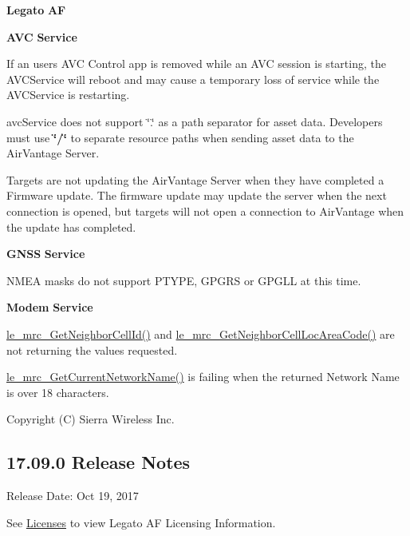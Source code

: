 {\bfseries Legato} {\bfseries AF} 

{\bfseries A\+VC} {\bfseries Service} 
\begin{DoxyItemize}
\item If an users A\+VC Control app is removed while an A\+VC session is starting, the A\+V\+C\+Service will reboot and may cause a temporary loss of service while the A\+V\+C\+Service is restarting.
\item {\ttfamily avc\+Service} does not support \char`\"{}.\char`\"{} as a path separator for asset data. Developers must use {\bfseries \char`\"{}/\char`\"{}} to separate resource paths when sending asset data to the Air\+Vantage Server.
\item Targets are not updating the Air\+Vantage Server when they have completed a Firmware update. The firmware update may update the server when the next connection is opened, but targets will not open a connection to Air\+Vantage when the update has completed.
\end{DoxyItemize}

{\bfseries G\+N\+SS} {\bfseries Service} 
\begin{DoxyItemize}
\item N\+M\+EA masks do not support P\+T\+Y\+PE, G\+P\+G\+RS or G\+P\+G\+LL at this time.
\end{DoxyItemize}

{\bfseries Modem} {\bfseries Service} 
\begin{DoxyItemize}
\item {\ttfamily \hyperlink{le__mrc__interface_8h_abdbc94e474235417d8610e2eb95558eb}{le\+\_\+mrc\+\_\+\+Get\+Neighbor\+Cell\+Id()}} and {\ttfamily \hyperlink{le__mrc__interface_8h_a70ba0ca70367bc673a6bca1e246bb88f}{le\+\_\+mrc\+\_\+\+Get\+Neighbor\+Cell\+Loc\+Area\+Code()}} are not returning the values requested.
\item {\ttfamily \hyperlink{le__mrc__interface_8h_a45fe1941f520c1e4a23b2794dd2a8232}{le\+\_\+mrc\+\_\+\+Get\+Current\+Network\+Name()}} is failing when the returned Network Name is over 18 characters.
\end{DoxyItemize}

Copyright (C) Sierra Wireless Inc. \hypertarget{releaseNotes17090}{}\subsection{17.09.0 Release Notes}\label{releaseNotes17090}
Release Date\+: Oct 19, 2017

See \hyperlink{aboutLicenses}{Licenses} to view Legato AF Licensing Information.

